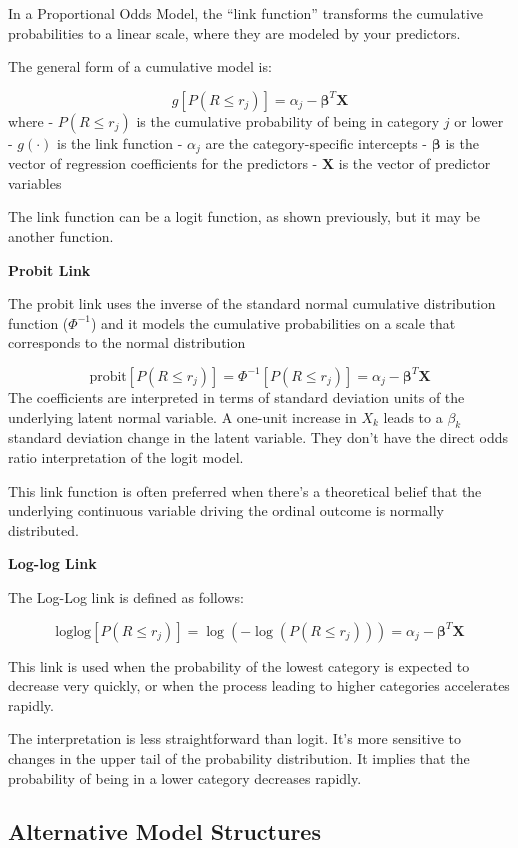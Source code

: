 \documentclass[
  letterpaper,
  DIV=11,
  numbers=noendperiod]{scrartcl}
\begin{document}
In a Proportional Odds Model, the ``link function'' transforms the
cumulative probabilities to a linear scale, where they are modeled by
your predictors.

The general form of a cumulative model is:

\[
g[P(R \leq r_j)] = \alpha_j - \boldsymbol{\beta}^T\boldsymbol{X}
\] where - \(P(R \leq r_j)\) is the cumulative probability of being in
category \(j\) or lower - \(g(\cdot)\) is the link function -
\(\alpha_j\) are the category-specific intercepts -
\(\boldsymbol{\beta}\) is the vector of regression coefficients for the
predictors - \(\boldsymbol{X}\) is the vector of predictor variables

The link function can be a logit function, as shown previously, but it
may be another function.

\textbf{Probit Link}

The probit link uses the inverse of the standard normal cumulative
distribution function (\(\Phi^{-1}\)) and it models the cumulative
probabilities on a scale that corresponds to the normal distribution

\[
\text{probit}[P(R\leq r_j)] = \Phi^{-1}[P(R\leq r_j)] =  \alpha_j - \boldsymbol{\beta}^T\boldsymbol{X}
\] The coefficients are interpreted in terms of standard deviation units
of the underlying latent normal variable. A one-unit increase in \(X_k\)
leads to a \(\beta_k\) standard deviation change in the latent variable.
They don't have the direct odds ratio interpretation of the logit model.

This link function is often preferred when there's a theoretical belief
that the underlying continuous variable driving the ordinal outcome is
normally distributed.

\textbf{Log-log Link}

The Log-Log link is defined as follows:

\[
\text{loglog}[P(R\leq r_j)] =  \log(-\log(P(R\leq r_j))) =  \alpha_j - \boldsymbol{\beta}^T\boldsymbol{X}
\]

This link is used when the probability of the lowest category is
expected to decrease very quickly, or when the process leading to higher
categories accelerates rapidly.

The interpretation is less straightforward than logit. It's more
sensitive to changes in the upper tail of the probability distribution.
It implies that the probability of being in a lower category decreases
rapidly.

\hypertarget{alternative-model-structures}{%
\subsection{Alternative Model
Structures}\label{alternative-model-structures}}
\end{document}
